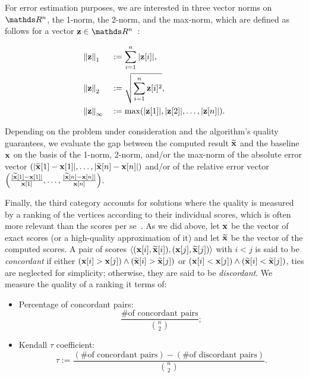 For error estimation purposes, we are interested in three vector norms on
$\real^n$, the 1-norm, the 2-norm, and the max-norm, which are defined as
follows for a vector $\vect{z} \in \real^n$~\cite{pugh2002real}:

\begin{alignat*}{2}
    &\onenorm{\vect{z}} &&:= \sum_{i = 1}^n|\vect{z}[i]|,\\
    &\twonorm{\vect{z}} &&:= \sqrt{\sum_{i = 1}^n \vect{z}[i]^2},\\
    &\maxnorm{\vect{z}} &&:= \max(|\vect{z}[1]|, |\vect{z}[2]|, \ldots, |\vect{z}[n]|).
\end{alignat*}

Depending on the problem under consideration and the algorithm's quality
guarantees, we evaluate the gap between the computed result
$\widetilde{\mathbf{x}}$ and the baseline $\mathbf{x}$ on the basis of the 1-norm, 2-norm, and/or
the max-norm of the absolute
error vector $(|\widetilde{\mathbf{x}}[1] - \mathbf{x}[1]|, \ldots, |\widetilde{\mathbf{x}}[n] - \mathbf{x}[n]|)$
and/or of the relative error vector $\roundb{\frac{|\xapprox[1] -
\vect{x}[1]|}{\vect{x}[1]}, \ldots, \frac{|\xapprox[n] - \vect{x}[n]|}{\vect{x}[n]}}$.

Finally, the third category accounts for solutions where the quality is measured
by a ranking of the vertices according to their individual scores, which is often
more relevant than the scores per se~\cite{DBLP:conf/faw/OkamotoCL08,newman2018networks}.
As we did above, let $\mathbf{x}$ be the vector of exact scores (or a high-quality
approximation of it) and let $\widetilde{\mathbf{x}}$ be the vector of the computed
scores.
A pair of scores $\left<(\vect{x}[i], \widetilde{\vect{x}}[i]), (\vect{x}[j], \widetilde{\vect{x}}[j])\right>$
with $i < j$ is said to be \emph{concordant} if either
$(\mathbf{x}[i] > \mathbf{x}[j]) \wedge (\widetilde{\mathbf{x}}[i] >
\widetilde{\mathbf{x}}[j])$ or $(\mathbf{x}[i] < \mathbf{x}[j]) \wedge (\widetilde{\mathbf{x}}[i] <
\widetilde{\mathbf{x}}[j])$, ties are neglected for simplicity; otherwise, they are said to be \emph{discordant}.
We measure the quality of a ranking it terms of:
\begin{itemize}
    \item Percentage of concordant pairs:
    \[
    \frac{\text{\# of concordant pairs}}{{n \choose 2}};
    \]
    \item Kendall $\tau$ coefficient:
    \[
        \tau := \frac{(\text{\# of concordant pairs}) - (\text{\# of discordant pairs})}{{n \choose 2}}.
    \]
\end{itemize}
